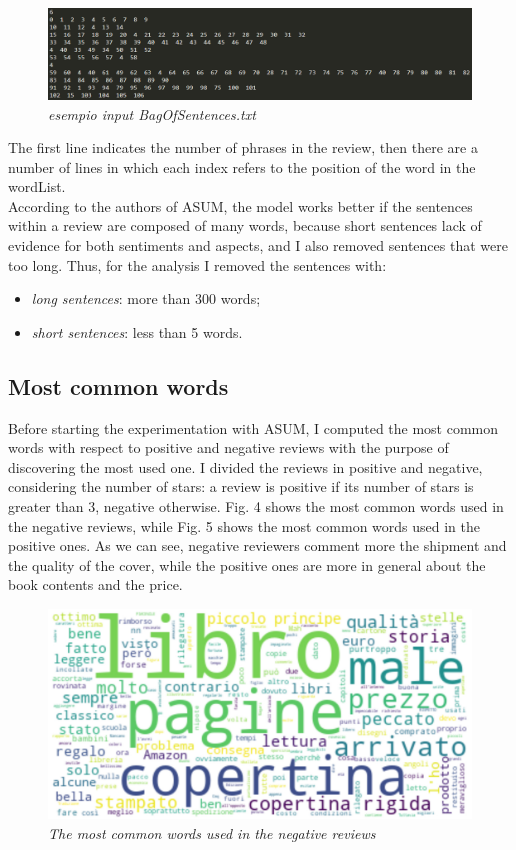 \documentclass[a4paper,12pt]{article}
\begin{document}
\begin{figure}[H]
	\centering
	\includegraphics[width=0.9\linewidth]{img/inputBag.png}
	\caption{\textit{esempio input BagOfSentences.txt}}
\end{figure}

\noindent The first line indicates the number of phrases in the review, then there are a number of lines in which each index refers to the position of the word in the wordList. \\

\noindent According to the authors of ASUM, the model works better if the sentences within a review are composed of many words, because short sentences lack of evidence for both sentiments and aspects, and I also removed sentences that were too long.
Thus, for the analysis I removed the sentences with:
\begin{itemize}
	\item \textit{long sentences}: more than 300 words;
	\item \textit{short sentences}: less than 5 words.
\end{itemize}

\subsection{Most common words}
Before starting the experimentation with ASUM, I computed the most common words with respect to positive and negative reviews with the purpose of discovering the most used one. I divided the reviews in positive and negative, considering the number of stars: a review is positive if its number of stars is greater than 3, negative otherwise. Fig. 4 shows the most common words used in the negative reviews, while Fig. 5 shows the most common words used in the positive ones. As we can see, negative reviewers comment more the shipment and the quality of the cover, while the positive ones are more in general about the book contents and the price.

\begin{figure}[H]
	\centering
	\includegraphics[width=0.9\linewidth]{img/bad_words.jpg}
	\caption{\textit{The most common words used in the negative reviews}}
\end{figure}
\end{document}
